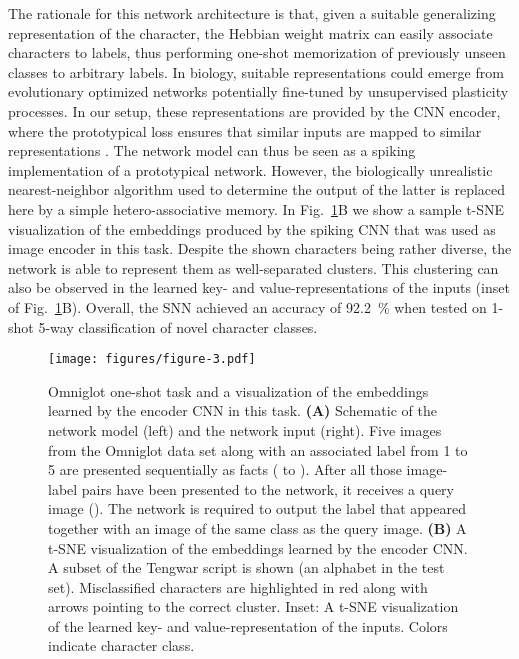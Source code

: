 \documentclass{article}
\begin{document}
The rationale for this network architecture is that, given a suitable generalizing representation of the character, the Hebbian weight matrix can easily associate characters to labels, thus performing one-shot memorization of previously unseen classes to arbitrary labels. In biology, suitable representations could emerge from evolutionary optimized networks potentially fine-tuned by unsupervised plasticity processes. In our setup, these representations are provided by the \gls{CNN} encoder, where the prototypical loss ensures that similar inputs are mapped to similar representations \cite{snell2017prototypical}. The network model can thus be seen as a spiking implementation of a prototypical network. However, the biologically unrealistic nearest-neighbor algorithm used to determine the output of the latter is replaced here by a simple hetero-associative memory. 
In Fig.~\ref{fig:fig3}B we show a sample t-SNE visualization of the embeddings produced by the spiking \gls{CNN} that was used as image encoder in this task. Despite the shown characters being rather diverse, the network is able to represent them as well-separated clusters. This clustering can also be observed in the learned key- and value-representations of the inputs (inset of Fig.~\ref{fig:fig3}B). Overall, the SNN achieved an accuracy of \SI{92.2}{\percent} when tested on 1-shot 5-way classification of novel character classes.


\begin{figure}\centering
\texttt{[image: figures/figure-3.pdf]}
\caption{Omniglot one-shot task and a visualization of the embeddings learned by the encoder \gls{CNN} in this task.
\textbf{(A)} Schematic of the network model (left) and the network input (right). Five images from the Omniglot data set along with an associated label from \num{1} to \num{5} are presented sequentially as facts ( to ). After all those image-label pairs have been presented to the network, it receives a query image (). The network is required to output the label that appeared together with an image of the same class as the query image.
\textbf{(B)} A t-SNE visualization of the embeddings learned by the encoder \gls{CNN}. A subset of the Tengwar script is shown (an alphabet in the test set). Misclassified characters are highlighted in red along with arrows pointing to the correct cluster. Inset: A t-SNE visualization of the learned key- and value-representation of the inputs. Colors indicate character class.}
\label{fig:fig3}
\end{figure}
\end{document}
